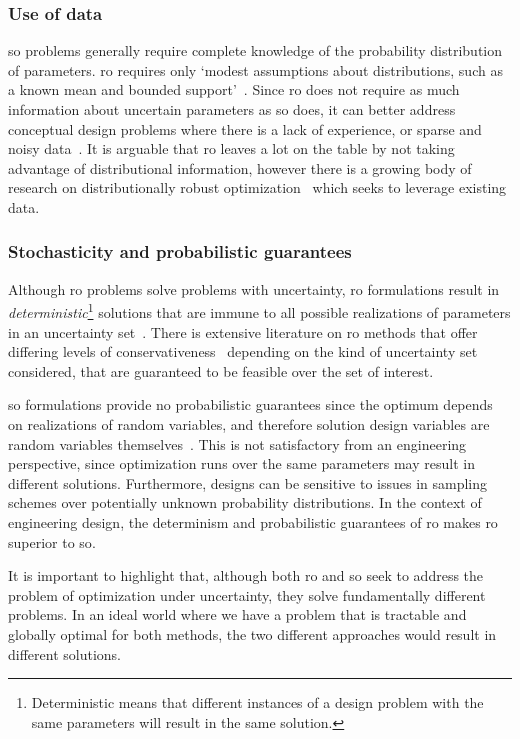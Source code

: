 \subsubsection{Use of data}

\gls{so} problems generally require complete knowledge of the probability distribution of
parameters.
\gls{ro} requires only `modest assumptions  about distributions, such as a known mean and
bounded support'~\cite{Chen2007}. Since \gls{ro} does not require as much information
about uncertain parameters as \gls{so} does, it can better address conceptual design problems where there
is a lack of experience, or sparse and noisy data~\cite{Bertsimas2011}. It is arguable that \gls{ro}
leaves a lot on the table by not taking advantage of distributional information,
however there is a growing body of research on distributionally robust optimization~\cite{Bertsimas2017}
which seeks to leverage existing data.

\subsubsection{Stochasticity and probabilistic guarantees}

Although \gls{ro} problems solve problems with uncertainty,
\gls{ro} formulations result in \emph{deterministic}\footnote{Deterministic means that
different instances of a design problem with
the same parameters will result in the same solution.} solutions that are immune
to all possible realizations of parameters in an uncertainty set~\cite{Bertsimas2011}.
There is extensive literature on \gls{ro} methods
that offer differing levels of conservativeness~\cite{Bertsimas2004}
depending on the kind of uncertainty set considered, that are guaranteed
to be feasible over the set of interest.

\gls{so} formulations provide no probabilistic guarantees
since the optimum depends on realizations of random variables, and therefore solution
design variables are random variables themselves~\cite{Shmoys2004}.
This is not satisfactory from an engineering perspective, since
optimization runs over the same parameters may result in different
solutions. Furthermore, designs
can be sensitive to issues in sampling schemes over potentially unknown
probability distributions. In the context of engineering design, the determinism
and probabilistic guarantees of \gls{ro} makes
\gls{ro} superior to \gls{so}.

It is important to highlight that,
although both \gls{ro} and \gls{so} seek to address the problem
of optimization under uncertainty, they solve fundamentally different problems. In an ideal world where
we have a problem that is tractable and globally optimal for both methods, the two different
approaches would result in different solutions.

